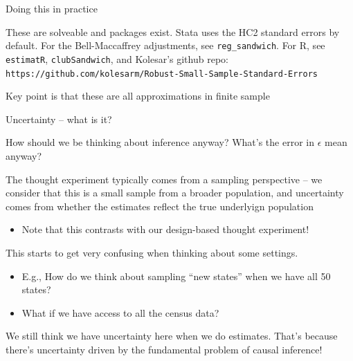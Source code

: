 \documentclass[notes,11pt, aspectratio=169]{beamer}
\newenvironment{wideitemize}{\itemize\addtolength{\itemsep}{10pt}}{\enditemize}
\begin{document}
\begin{frame}{Doing this in practice}
  \begin{wideitemize}
  \item These are solveable and packages exist. Stata uses the HC2
    standard errors by default. For the Bell-Maccaffrey adjustments,
    see \texttt{reg\_sandwich}. For R, see \texttt{estimatR},
    \texttt{clubSandwich}, and Kolesar's github repo:
    \texttt{https://github.com/kolesarm/Robust-Small-Sample-Standard-Errors}
  \item Key point is that these are all approximations in finite sample
  \end{wideitemize}
\end{frame}

\begin{frame}{Uncertainty -- what is it?}
  \begin{wideitemize}
  \item How should we be thinking about inference anyway? What's the error in $\epsilon$ mean anyway?
  \item The thought experiment typically comes from a sampling
    perspective -- we consider that this is a small sample from a
    broader population, and uncertainty comes from whether the estimates reflect the true underlyign population
    \begin{itemize}
    \item Note that this contrasts with our design-based thought experiment!
    \end{itemize}
  \item This starts to get very confusing when thinking about some settings.
    \begin{itemize}
    \item E.g., How do we think about sampling ``new states'' when we have all 50 states?
    \item What if we have access to all the census data?
    \end{itemize}
  \item We still think we have uncertainty here when we do
    estimates. That's because there's uncertainty driven by the
    fundamental problem of causal inference!
  \end{wideitemize}
\end{frame}
\end{document}
